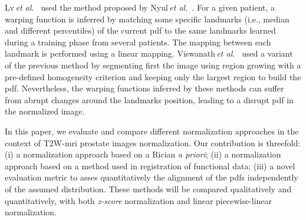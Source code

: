 Lv\,\textit{et al.}~\cite{lv2009computerized} used the method proposed by Nyul\,\textit{et al.}~\cite{nyul2000new}.
For a given patient, a warping function is inferred by matching some specific landmarks (i.e., median and different percentiles) of the current \ac{pdf} to the same landmarks learned during a training phase from several patients. 
The mapping between each landmark is performed using a linear mapping.
Viswanath\,\textit{et al.}~\cite{viswanath2012central} used a variant of the previous method by segmenting first the image using region growing with a pre-defined homogeneity criterion and keeping only the largest region to build the \ac{pdf}.
Nevertheless, the warping functions inferred by these methods can suffer from abrupt changes around the landmarks position, leading to a disrupt \ac{pdf} in the normalized image.  

In this paper, we evaluate and compare different normalization approaches in the context of T2W-\ac{mri} prostate images normalization. Our contribution is threefold: (i) a normalization approach based on a Rician \textit{a priori}; (ii) a normalization approach based on a method used in registration of functional data; (iii) a novel evaluation metric to asses quantitatively the alignment of the \acp{pdf} independently of the assumed distribution. 
These methods will be compared qualitatively and quantitatively, with both \textit{z-score} normalization and linear piecewise-linear normalization.

